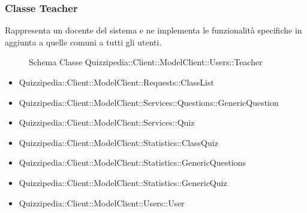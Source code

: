 \subsubsection{Classe Teacher}
Rappresenta un docente del sistema e ne implementa le funzionalità specifiche in aggiunta a quelle comuni a tutti gli utenti.
\begin{figure}[H]
\centering
\noindent{}
\caption[Schema Classe Teacher]{Schema Classe Quizzipedia::Client::ModelClient::Users::Teacher}
\end{figure}
\begin{itemize}
\item Quizzipedia::Client::ModelClient::Requests::ClassList
\item Quizzipedia::Client::ModelClient::Services::Questions::GenericQuestion
\item Quizzipedia::Client::ModelClient::Services::Quiz
\item Quizzipedia::Client::ModelClient::Statistics::ClassQuiz
\item Quizzipedia::Client::ModelClient::Statistics::GenericQuestions
\item Quizzipedia::Client::ModelClient::Statistics::GenericQuiz
\item Quizzipedia::Client::ModelClient::Users::User
\end{itemize}
